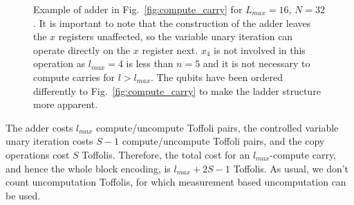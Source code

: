 \begin{figure}
\centering

\caption{\label{fig:adder}Example of adder in Fig.~\ref{fig:compute_carry} for $L_{max} = 16$, $N=32$. It is important to note that the construction of the adder leaves the $x$ registers unaffected, so the variable unary iteration can operate directly on the $x$ register next. $x_4$ is not involved in this operation as $l_{max}=4$ is less than $n=5$ and it is not necessary to compute carries for $l > l_{max}$. The qubits have been ordered differently to Fig.~\ref{fig:compute_carry} to make the ladder structure more apparent.}
\end{figure}

The adder costs $l_{max}$ compute/uncompute Toffoli pairs, the controlled variable unary iteration costs $S-1$ compute/uncompute Toffoli pairs, and the copy operations cost $S$ Toffolis.  Therefore, the total cost for an $l_{max}$-compute carry, and hence the whole block encoding, is $l_{max} + 2S - 1$ Toffolis. As usual, we don't count uncomputation Toffolis, for which measurement based uncomputation can be used.
